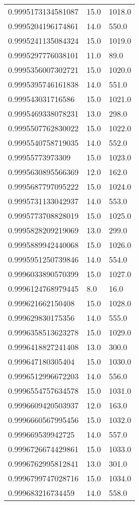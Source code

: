 \begin{center}
\begin{supertabular}[H]{p{0.30\textwidth}p{0.05\textwidth}p{0.05\textwidth}}
0.9995173134581087 & 15.0 & 1018.0 \\ 
0.9995204196174861 & 14.0 & 550.0 \\ 
0.9995241135084324 & 15.0 & 1019.0 \\ 
0.9995297776038101 & 11.0 & 89.0 \\ 
0.9995356007302721 & 15.0 & 1020.0 \\ 
0.9995395746161838 & 14.0 & 551.0 \\ 
0.999543031716586 & 15.0 & 1021.0 \\ 
0.9995469338078231 & 13.0 & 298.0 \\ 
0.9995507762830022 & 15.0 & 1022.0 \\ 
0.9995540758719035 & 14.0 & 552.0 \\ 
0.99955773973309 & 15.0 & 1023.0 \\ 
0.9995630895566369 & 12.0 & 162.0 \\ 
0.9995687797095222 & 15.0 & 1024.0 \\ 
0.9995731133042937 & 14.0 & 553.0 \\ 
0.9995773708828019 & 15.0 & 1025.0 \\ 
0.9995828209219069 & 13.0 & 299.0 \\ 
0.9995889942440068 & 15.0 & 1026.0 \\ 
0.9995951250739846 & 14.0 & 554.0 \\ 
0.9996033890570399 & 15.0 & 1027.0 \\ 
0.9996124768979445 & 8.0 & 16.0 \\ 
0.999621662150408 & 15.0 & 1028.0 \\ 
0.999629830175356 & 14.0 & 555.0 \\ 
0.9996358513623278 & 15.0 & 1029.0 \\ 
0.9996418827241408 & 13.0 & 300.0 \\ 
0.999647180305404 & 15.0 & 1030.0 \\ 
0.9996512996672203 & 14.0 & 556.0 \\ 
0.9996554757634578 & 15.0 & 1031.0 \\ 
0.9996609420503937 & 12.0 & 163.0 \\ 
0.9996660567995456 & 15.0 & 1032.0 \\ 
0.999669539942725 & 14.0 & 557.0 \\ 
0.9996726674429861 & 15.0 & 1033.0 \\ 
0.9996762995812841 & 13.0 & 301.0 \\ 
0.9996799747028716 & 15.0 & 1034.0 \\ 
0.999683216734459 & 14.0 & 558.0 \\ 

\end{supertabular}
\end{center}
